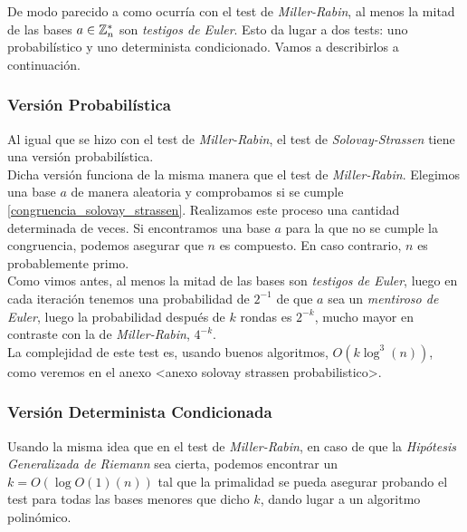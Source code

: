 De modo parecido a como ocurría con el test de \textit{Miller-Rabin}, al menos la mitad de las bases $a \in \mathbb{Z}_n^*$ son \textit{testigos de Euler}. Esto da lugar a dos tests: uno probabilístico y uno determinista condicionado. Vamos a describirlos a continuación.

\subsubsection{Versión Probabilística}

Al igual que se hizo con el test de \textit{Miller-Rabin}, el test de \textit{Solovay-Strassen} tiene una versión probabilística.\\

Dicha versión funciona de la misma manera que el test de \textit{Miller-Rabin}. Elegimos una base $a$ de manera aleatoria y comprobamos si se cumple \eqref{congruencia_solovay_strassen}. Realizamos este proceso una cantidad determinada de veces. Si encontramos una base $a$ para la que no se cumple la congruencia, podemos asegurar que $n$ es compuesto. En caso contrario, $n$ es probablemente primo.\\

Como vimos antes, al menos la mitad de las bases son \textit{testigos de Euler}, luego en cada iteración tenemos una probabilidad de $2^{-1}$ de que $a$ sea un \textit{mentiroso de Euler}, luego la probabilidad después de $k$ rondas es $2^{-k}$, mucho mayor en contraste con la de \textit{Miller-Rabin}, $4^{-k}$.\\

La complejidad de este test es, usando buenos algoritmos, $O(k\log^3(n))$, como veremos en el anexo <anexo solovay strassen probabilistico>.

\subsubsection{Versión Determinista Condicionada}

Usando la misma idea que en el test de \textit{Miller-Rabin}, en caso de que la \textit{Hipótesis Generalizada de Riemann} sea cierta, podemos encontrar un $k = O(\log{O(1)}(n))$ tal que la primalidad se pueda asegurar probando el test para todas las bases menores que dicho $k$, dando lugar a un algoritmo polinómico.

\endinput
